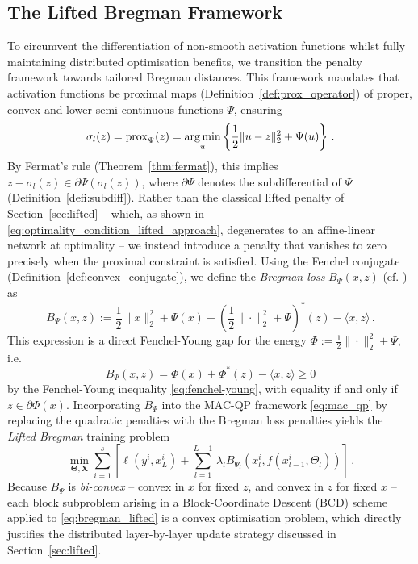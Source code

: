 \subsection{The Lifted Bregman Framework}
To circumvent the differentiation of non-smooth activation functions whilst fully maintaining distributed optimisation benefits, we transition the penalty framework towards tailored Bregman distances. This framework mandates that activation functions be proximal maps (Definition~\ref{def:prox_operator}) of proper, convex and lower semi-continuous functions $\Psi$, ensuring
\begin{equation}\label{eq:proximal_activation}
    \sigma_l(z) = \operatorname{prox}_{\Psi}(z) = \operatorname*{arg\,min}_{u} \left\{ \frac{1}{2} \| u - z \|_2^2 + \Psi(u) \right\} \, .
\end{equation}
By Fermat's rule (Theorem~\ref{thm:fermat}), this implies $z - \sigma_l(z) \in \partial \Psi(\sigma_l(z))$, where $\partial \Psi$ denotes the subdifferential of $\Psi$ (Definition~\ref{defi:subdiff}). Rather than the classical lifted penalty of Section~\ref{sec:lifted} -- which, as shown in \eqref{eq:optimality_condition_lifted_approach}, degenerates to an affine-linear network at optimality -- we instead introduce a penalty that vanishes to zero precisely when the proximal constraint is satisfied. Using the Fenchel conjugate (Definition~\ref{def:convex_conjugate}), we define the \emph{Bregman loss} $B_{\Psi}(x, z)$ (cf. \cite{WangBenning2023}) as
\begin{equation}\label{eq:bregman_loss}
    B_{\Psi}(x, z) := \frac{1}{2}\|x\|_2^2 + \Psi(x) + \left(\frac{1}{2}\|\cdot\|_2^2 + \Psi\right)^*(z) - \langle x, z \rangle \, .
\end{equation}
This expression is a direct Fenchel-Young gap for the energy $\Phi := \frac{1}{2}\|\cdot\|_2^2 + \Psi$, i.e.\
\begin{equation}\label{eq:bregman_fenchel_young_gap}
    B_{\Psi}(x, z) = \Phi(x) + \Phi^*(z) - \langle x, z \rangle \ge 0
\end{equation}
by the Fenchel-Young inequality \eqref{eq:fenchel-young}, with equality if and only if $z \in \partial \Phi(x)$. Incorporating $B_{\Psi}$ into the MAC-QP framework \eqref{eq:mac_qp} by replacing the quadratic penalties with the Bregman loss penalties yields the \emph{Lifted Bregman} training problem \cite{WangBenning2023}
\begin{equation}\label{eq:bregman_lifted}
    \min_{\mathbf{\Theta}, \mathbf{X}}  \sum_{i=1}^{s} \left[\ell\left(y^i, x_{L}^{i}\right) + \sum_{l=1}^{L-1} \,  \lambda_l B_{\Psi_l}\left(x_{l}^{i}, f(x_{l - 1}^{i}, \Theta_l) \right)\right] \, .
\end{equation}
Because $B_\Psi$ is \emph{bi-convex} -- convex in $x$ for fixed $z$, and convex in $z$ for fixed $x$ -- each block subproblem arising in a Block-Coordinate Descent (BCD) scheme applied to \eqref{eq:bregman_lifted} is a convex optimisation problem, which directly justifies the distributed layer-by-layer update strategy discussed in Section~\ref{sec:lifted}.

